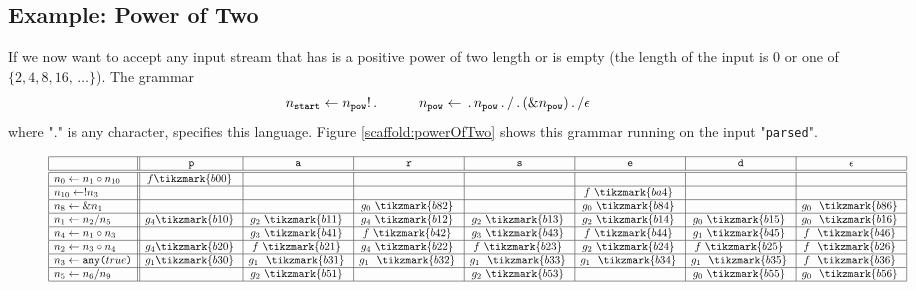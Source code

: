 \subsection{Example: Power of Two}

If we now want to accept any input stream that has is a positive power of two length or is empty (the length of the input is $0$ or one of $\lbrace 2, 4, 8, 16, \, \ldots \rbrace$).  The grammar 
\[ n_{\texttt{start}} \leftarrow n_{\texttt{pow}} !\,.\, \hspace*{1cm} n_{\texttt{pow}} \leftarrow \,.\,n_{\texttt{pow}}\,.\, / \,.\,(\&n_{\texttt{pow}})\,.\, / \epsilon \]
where "$.$" is any character, specifies this language.  Figure \ref{scaffold:powerOfTwo} shows this grammar running on the input "\texttt{parsed}".

\begin{figure}[h!] %
\[
\begin{array}{|l||c|c|c|c|c|c|c|}\hline
& \texttt{p} & \texttt{a} & \texttt{r} & \texttt{s} & \texttt{e} & \texttt{d} &  \epsilon \\ \hline \hline
n_{0} \prodnInternal n_{1} \circ n_{10} & f\tikzmark{b00}~ & & & & & & \\ \hline
n_{10} \prodnInternal ! n_{3} & & & & & f~\tikzmark{ba4}~ & & \\ \hline
n_{8} \prodnInternal \& n_{1} & & & g_{0}~\tikzmark{b82}~ & & g_{0}~\tikzmark{b84}~ & & g_{0}~~\tikzmark{b86}~ \\ \hline
n_{1} \prodnInternal n_{2} / n_{5} & g_{4}\tikzmark{b10}~ & g_{2}~\tikzmark{b11}~ &g_{4}~\tikzmark{b12}~  & g_{2}~\tikzmark{b13}~ & g_{2}~\tikzmark{b14}~ & g_{0}~\tikzmark{b15}~ & g_{0}~~\tikzmark{b16}~ \\ \hline
n_{4} \prodnInternal n_{1} \circ n_{3} & & g_{3}~\tikzmark{b41}~  & f~\tikzmark{b42}~ & g_{3}~\tikzmark{b43}~ & f~\tikzmark{b44}~ & g_{1}~\tikzmark{b45}~ & f~~\tikzmark{b46}~ \\ \hline
n_{2} \prodnInternal n_{3} \circ n_{4} & g_{4}\tikzmark{b20}~ & f~\tikzmark{b21}~ & g_{4}~\tikzmark{b22}~ & f~\tikzmark{b23}~ & g_{2}~\tikzmark{b24}~ & f~\tikzmark{b25}~ & f~~\tikzmark{b26}~ \\ \hline
n_{3} \prodnInternal \texttt{any($true$)} & g_{1}\tikzmark{b30}~ & g_{1}~~\tikzmark{b31}~ & g_{1}~~\tikzmark{b32}~ & g_{1}~~\tikzmark{b33}~ & g_{1}~~\tikzmark{b34}~ & g_{1}~~\tikzmark{b35}~ & f~~\tikzmark{b36}~ \\ \hline
n_{5} \prodnInternal n_{6} / n_{9} & & g_{2}~\tikzmark{b51}~ & & g_{2}~\tikzmark{b53}~ & & g_{0}~\tikzmark{b55}~ & g_{0}~~\tikzmark{b56}~ \\ \hline

\end{array}\]
\end{figure}
